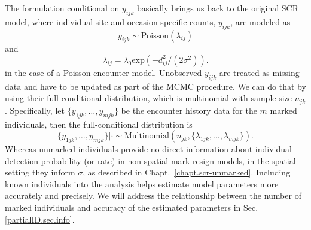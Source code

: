 The formulation conditional on $y_{ijk}$ basically brings us back to
the original SCR model, where individual site and occasion specific
counts, $y_{ijk}$, are modeled as
\[
y_{ijk} \sim \mbox{Poisson}(\lambda _{ij})
\]
and
\[
\lambda _{ij} = \lambda_0  \mbox{exp}(-d_{ij}^2/(2 \sigma^2)).
\]
in the case of a Poisson encounter model.
Unobserved $y_{ijk}$ are treated as missing data and have to be
updated as part of the MCMC procedure. We can do that by using their
full conditional distribution, which is multinomial with sample size
$n_{jk}$.
Specifically, let $\{y_{1jk}, \ldots, y_{mjk}\}$ be the encounter history data for
the $m$ marked individuals, then the full-conditional distribution is
\[
\{y_{1jk}, \ldots, y_{mjk}\}|\cdot \sim \mbox{Multinomial} (n_{jk}, \{\lambda_{1jk}, \ldots, \lambda_{mjk}\}).
\]
Whereas unmarked individuals %
provide no direct information about individual detection probability (or
rate) in non-spatial mark-resign models, in the spatial setting they
inform $\sigma$, as described in
Chapt.~\ref{chapt.scr-unmarked}. Including known individuals into the
analysis helps estimate
model parameters more accurately and precisely. We will address the
relationship between the number of marked individuals and accuracy of
the estimated parameters in Sec. \ref{partialID.sec.info}.


